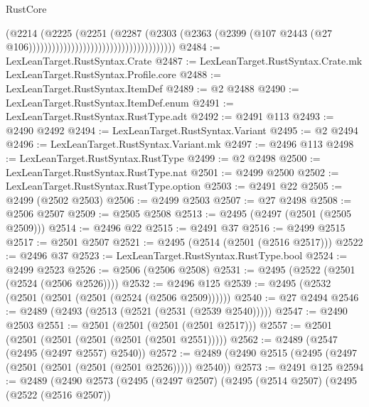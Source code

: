 \begin{lexlean}{RustCore}
\begin{coremodule}
                                                              (@2214
                                                                (@2225
                                                                  (@2251
                                                                    (@2287
                                                                      (@2303
                                                                        (@2363
                                                                          (@2399
                                                                            (@107
                                                                              @2443
                                                                              (@27
                                                                                @106))))))))))))))))))))))))))))))))))))))
@2484 := LexLeanTarget.RustSyntax.Crate
@2487 := LexLeanTarget.RustSyntax.Crate.mk LexLeanTarget.RustSyntax.Profile.core
@2488 := LexLeanTarget.RustSyntax.ItemDef
@2489 := @2 @2488
@2490 := LexLeanTarget.RustSyntax.ItemDef.enum
@2491 := LexLeanTarget.RustSyntax.RustType.adt
@2492 := @2491 @113
@2493 := @2490 @2492
@2494 := LexLeanTarget.RustSyntax.Variant
@2495 := @2 @2494
@2496 := LexLeanTarget.RustSyntax.Variant.mk
@2497 := @2496 @113
@2498 := LexLeanTarget.RustSyntax.RustType
@2499 := @2 @2498
@2500 := LexLeanTarget.RustSyntax.RustType.nat
@2501 := @2499 @2500
@2502 := LexLeanTarget.RustSyntax.RustType.option
@2503 := @2491 @22
@2505 := @2499 (@2502 @2503)
@2506 := @2499 @2503
@2507 := @27 @2498
@2508 := @2506 @2507
@2509 := @2505 @2508
@2513 := @2495 (@2497 (@2501 (@2505 @2509)))
@2514 := @2496 @22
@2515 := @2491 @37
@2516 := @2499 @2515
@2517 := @2501 @2507
@2521 := @2495 (@2514 (@2501 (@2516 @2517)))
@2522 := @2496 @37
@2523 := LexLeanTarget.RustSyntax.RustType.bool
@2524 := @2499 @2523
@2526 := @2506 (@2506 @2508)
@2531 := @2495 (@2522 (@2501 (@2524 (@2506 @2526))))
@2532 := @2496 @125
@2539 := @2495 (@2532 (@2501 (@2501 (@2501 (@2524 (@2506 @2509))))))
@2540 := @27 @2494
@2546 := @2489 (@2493 (@2513 (@2521 (@2531 (@2539 @2540)))))
@2547 := @2490 @2503
@2551 := @2501 (@2501 (@2501 (@2501 @2517)))
@2557 := @2501 (@2501 (@2501 (@2501 (@2501 (@2501 @2551)))))
@2562 := @2489 (@2547 (@2495 (@2497 @2557) @2540))
@2572 := @2489 (@2490 @2515 (@2495 (@2497 (@2501 (@2501 (@2501 (@2501 @2526))))) @2540))
@2573 := @2491 @125
@2594 := @2489
    (@2490
      @2573
      (@2495
        (@2497 @2507)
        (@2495
          (@2514 @2507)
          (@2495
            (@2522 (@2516 @2507))

\end{coremodule}
\end{lexlean}
